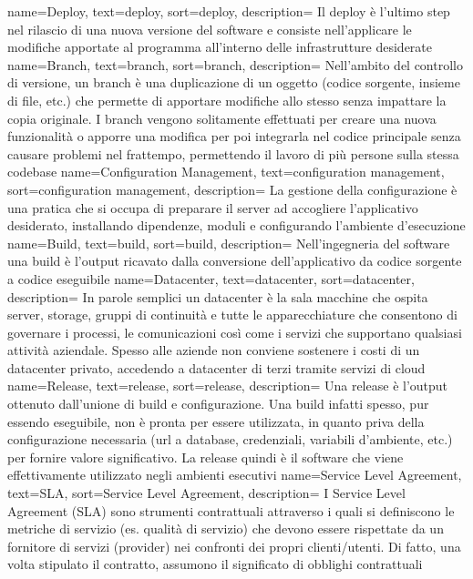 {
	name=Deploy,
	text=deploy,
	sort=deploy,
	description={ Il deploy è l'ultimo step nel rilascio di una nuova versione del software e consiste nell'applicare le modifiche apportate al programma all'interno delle infrastrutture desiderate}
}
{
	name=Branch,
	text=branch,
	sort=branch,
	description={ Nell'ambito del controllo di versione, un branch è una duplicazione di un oggetto (codice sorgente, insieme di file, etc.) che permette di apportare modifiche allo stesso senza impattare la copia originale. I branch vengono solitamente effettuati per creare una nuova funzionalità o apporre una modifica per poi integrarla nel codice principale senza causare problemi nel frattempo, permettendo il lavoro di più persone sulla stessa codebase}
}
{
	name=Configuration Management,
	text=configuration management,
	sort=configuration management,
	description={ La gestione della configurazione è una pratica che si occupa di preparare il server ad accogliere l'applicativo desiderato, installando dipendenze, moduli e configurando l'ambiente d'esecuzione}
}
{
	name=Build,
	text=build,
	sort=build,
	description={ Nell'ingegneria del software una build è l'output ricavato dalla conversione dell'applicativo da codice sorgente a codice eseguibile}
}
{
	name=Datacenter,
	text=datacenter,
	sort=datacenter,
	description={ In parole semplici un datacenter è la sala macchine che ospita server, storage, gruppi di continuità e tutte le apparecchiature che consentono di governare i processi, le comunicazioni così come i servizi che supportano qualsiasi attività aziendale. Spesso alle aziende non conviene sostenere i costi di un datacenter privato, accedendo a datacenter di terzi tramite servizi di cloud}
}
{
	name=Release,
	text=release,
	sort=release,
	description={ Una release è l'output ottenuto dall'unione di build e configurazione. Una build infatti spesso, pur essendo eseguibile, non è pronta per essere utilizzata, in quanto priva della configurazione necessaria (url a database, credenziali, variabili d'ambiente, etc.) per fornire valore significativo. La release quindi è il software che viene effettivamente utilizzato negli ambienti esecutivi}
}
{
	name=Service Level Agreement,
	text=SLA,
	sort=Service Level Agreement,
	description={ I Service Level Agreement (SLA) sono strumenti contrattuali attraverso i quali si definiscono le metriche di servizio (es. qualità di servizio) che devono essere rispettate da un fornitore di servizi (provider) nei confronti dei propri clienti/utenti. Di fatto, una volta stipulato il contratto, assumono il significato di obblighi contrattuali}
}
